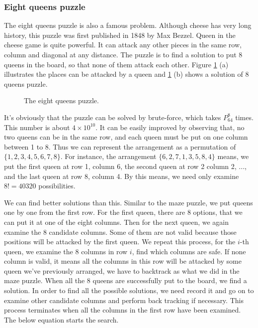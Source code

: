 \documentclass[UTF8]{article}
\begin{document}
\subsubsection{Eight queens puzzle}
The eight queens puzzle is also a famous problem. Although cheese has very long history, this
puzzle was first published in 1848 by Max Bezzel\cite{wiki-8-queens}.
Queen in the cheese game is quite powerful.
It can attack any other pieces in the same row, column and diagonal at any distance.
The puzzle is to find a solution to put 8 queens in the board, so that none of
them attack each other. Figure \ref{fig:8-queens-puzzle} (a) illustrates the places can
be attacked by a queen and \ref{fig:8-queens-puzzle} (b) shows a solution of 8 queens puzzle.

\begin{figure}[htbp]
 \centering
 \caption{The eight queens puzzle.}
 \label{fig:8-queens-puzzle}
\end{figure}

It's obviously that the puzzle can be solved by brute-force, which takes $P^8_{64}$ times.
This number is about $4 \times 10^{10}$. It can be easily improved by observing that,
no two queens can be in the same row, and each queen must be put on one column between
1 to 8. Thus we can represent the arrangement as a permutation of $\{1,2,3,4,5,6,7,8\}$.
For instance, the arrangement $\{6,2,7,1,3,5,8,4\}$ means, we put the first queen at row 1,
column 6, the second queen at row 2 column 2, ..., and the last queen at row 8, column 4.
By this means, we need only examine $8! = 40320$ possibilities.

We can find better solutions than this. Similar to the maze puzzle, we put queens one by
one from the first row. For the first queen, there are 8 options, that we can put it
at one of the eight columns. Then for the next queen, we again examine the 8 candidate
columns. Some of them are not valid because those positions will be attacked by the first
queen. We repeat this process, for the $i$-th queen, we examine the 8 columns
in row $i$, find which columns are safe. If none column is valid, it means all the
columns in this row will be attacked by some queen we've previously arranged, we have
to backtrack as what we did in the maze puzzle. When all the 8 queens are successfully
put to the board, we find a solution. In order to find all the possible solutions, we
need record it and go on to examine other candidate columns and perform back tracking if
necessary. This process terminates when all the columns in the first row have been
examined. The below equation starts the search.
\end{document}
